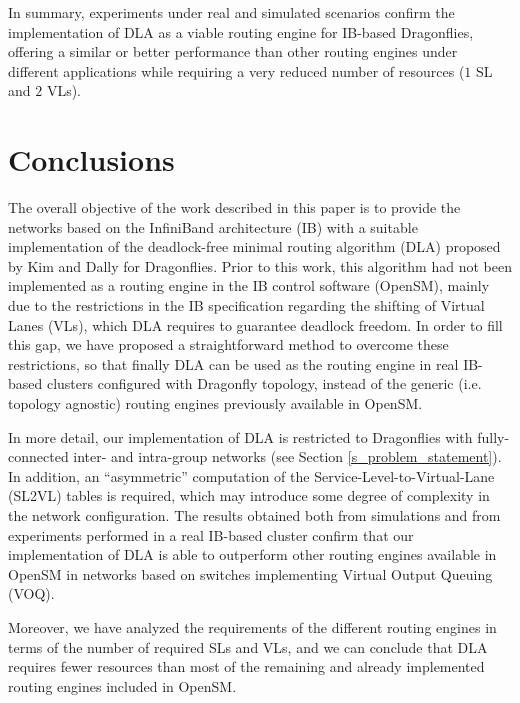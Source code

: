 \documentclass[review]{elsarticle}
\newcommand{\dflys}{Dragonflies}
\newcommand{\dfly}{Dragonfly}
\newcommand{\ib}{IB}
\newcommand{\ibl}{InfiniBand}
\begin{document}
In summary, experiments under real and simulated scenarios confirm the implementation of DLA as a 
viable routing engine for \ib-based \dflys{}, offering a similar or better performance than other routing engines under different applications
while requiring a very reduced number of resources ($1$ SL and $2$ VLs).

\section{Conclusions}
\label{s_conclusions}
The overall objective of the work described in this paper is to provide the networks based on the InfiniBand architecture (IB) with a suitable implementation of the deadlock-free minimal routing algorithm (DLA)
proposed by Kim and Dally for \dflys{}. Prior to this work, this algorithm had not been implemented as a routing engine in the \ib{} control software (OpenSM), mainly due to the restrictions in the \ib{} specification regarding the shifting of Virtual Lanes (VLs), which DLA requires to guarantee deadlock freedom. In order to fill this gap, we have proposed a straightforward method to overcome these restrictions, so that finally DLA can be used as the routing engine in real \ib-based clusters configured with \dfly{} topology, instead of the generic (i.e. topology agnostic) routing engines previously available in OpenSM.

In more detail, our implementation of DLA is restricted to \dflys{} with fully-connected inter- and intra-group networks (see Section \ref{s_problem_statement}). In addition, an ``asymmetric'' computation of the Service-Level-to-Virtual-Lane (SL2VL) tables is required, which may introduce some degree of complexity in the network configuration. The results obtained both from simulations and from experiments performed in a real \ib-based cluster confirm
that our implementation of DLA is able to outperform other routing engines available in OpenSM in networks based on switches implementing Virtual Output Queuing (VOQ).

Moreover, we have analyzed the requirements of the different routing engines in terms of the number of required SLs and VLs, and we can conclude that DLA requires fewer resources than most of the remaining and already implemented routing engines
included in OpenSM.





\end{document}
